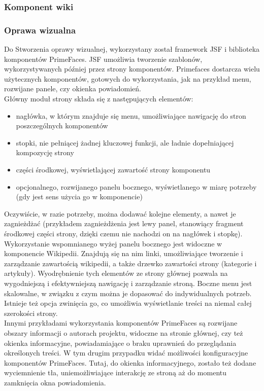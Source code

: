 \documentclass{classrep}
\begin{document}
\subsubsection{Komponent wiki}

\subsubsection{Oprawa wizualna}
Do Stworzenia oprawy wizualnej, wykorzystany został framework JSF i biblioteka komponentów PrimeFaces. JSF umożliwia tworzenie szablonów, wykorzystywanych później przez strony komponentów. Primefaces dostarcza wielu użytecznych komponentów, gotowych do wykorzystania, jak na przykład menu, rozwijane panele, czy okienka powiadomień.\\
Główny moduł strony składa się z następujących elementów:
\begin{itemize}
  \item nagłówka, w którym znajduje się menu, umożliwiające nawigację do stron poszczególnych komponentów 
  \item stopki, nie pełniącej żadnej kluczowej funkcji, ale ładnie dopełniającej kompozycję strony
  \item części środkowej, wyświetlającej zawartość strony komponentu
  \item opcjonalnego, rozwijanego panelu bocznego, wyświetlanego w miarę potrzeby (gdy jest sens użycia go w komponencie)
\end{itemize}
Oczywiście, w razie potrzeby, można dodawać kolejne elementy, a nawet je zagnieżdżać (przykładem zagnieżdżenia jest lewy panel, stanowiący fragment środkowej części strony, dzięki czemu nie nachodzi on na nagłówek i stopkę).\\
Wykorzystanie wspomnianego wyżej panelu bocznego jest widoczne w komponencie Wikipedii. Znajdują się na nim linki, umożliwiające tworzenie i zarządzanie zawartością wikipedii, a także drzewko zawartości strony (kategorie i artykuły). Wyodrębnienie tych elementów ze strony głównej pozwala na wygodniejszą i efektywniejszą nawigację i zarządzanie stroną. Boczne menu jest skalowalne, w związku z czym można je dopasować do indywidualnych potrzeb. Istnieje też opcja zwinięcia go, co umożliwia wyświetlanie treści na niemal całej szerokości strony.\\
Innymi przykładami wykorzystania komponentów PrimeFaces są rozwijane obszary informacji o autorach projektu, widoczne na stronie głównej, czy też okienka informacyjne, powiadamiające o braku uprawnień do przeglądania określonych treści. W tym drugim przypadku widać możliwości konfiguracyjne komponentów PrimeFaces. Tutaj, do okienka informacyjnego, zostało też dodane wyciemnienie tła, uniemożliwiające interakcję ze stroną aż do momentu zamknięcia okna powiadomienia.
\end{document}
